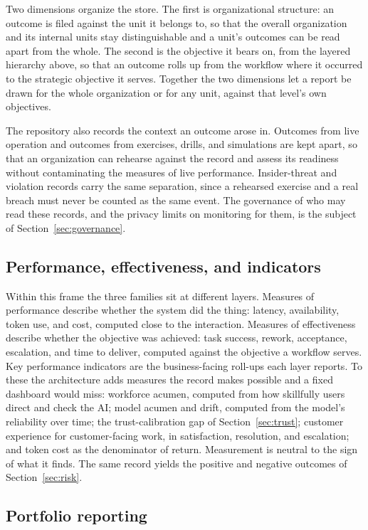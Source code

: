 \documentclass[11pt]{article}
\begin{document}
Two dimensions organize the store. The first is organizational structure: an
outcome is filed against the unit it belongs to, so that the overall organization
and its internal units stay distinguishable and a unit's outcomes can be read
apart from the whole. The second is the objective it bears on, from the layered
hierarchy above, so that an outcome rolls up from the workflow where it occurred
to the strategic objective it serves. Together the two dimensions let a report be
drawn for the whole organization or for any unit, against that level's own
objectives.

The repository also records the context an outcome arose in. Outcomes from live
operation and outcomes from exercises, drills, and simulations are kept apart, so
that an organization can rehearse against the record and assess its readiness
without contaminating the measures of live performance. Insider-threat and
violation records carry the same separation, since a rehearsed exercise and a
real breach must never be counted as the same event. The governance of who may
read these records, and the privacy limits on monitoring for them, is the subject
of Section~\ref{sec:governance}.

\subsection{Performance, effectiveness, and indicators}

Within this frame the three families sit at different layers. Measures of
performance describe whether the system did the thing: latency, availability,
token use, and cost, computed close to the interaction. Measures of effectiveness
describe whether the objective was achieved: task success, rework, acceptance,
escalation, and time to deliver, computed against the objective a workflow serves.
Key performance indicators are the business-facing roll-ups each layer reports. To
these the architecture adds measures the record makes possible and a fixed
dashboard would miss: workforce acumen, computed from how skillfully users direct
and check the AI; model acumen and drift, computed from the model's reliability
over time; the trust-calibration gap of Section~\ref{sec:trust}; customer
experience for customer-facing work, in satisfaction, resolution, and escalation;
and token cost as the denominator of return. Measurement is neutral to the sign
of what it finds. The same record yields the positive and negative outcomes of
Section~\ref{sec:risk}.

\subsection{Portfolio reporting}
\end{document}
